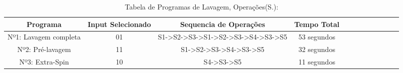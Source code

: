 \begin{table}[H]
	\footnotesize
	\centering
	\caption{Tabela de Programas de Lavagem, Operações(S.):}
	\begin{tabular}{|c|c|c|c|c|c|c|c|c|c|c|c|}\hline

		Programa 			  & Input Selecionado & Sequencia de Operações 				& Tempo Total \\ 
        \hline		
		Nº1: Lavagem completa & 		01        & S1->S2->S3->S1->S2->S3->S4->S3->S5	& 53 segundos \\
        \hline
        Nº2: Pré-lavagem 	  &         11 	      & S1->S2->S3->S4->S3->S5    			& 32 segundos \\
		\hline
        Nº3: Extra-Spin 	  &         10 	      & S4->S3->S5			    			& 11 segundos \\
		\hline
    \end{tabular}
    \
    \label{tab.estados}
\end{table}	
\normalsize

